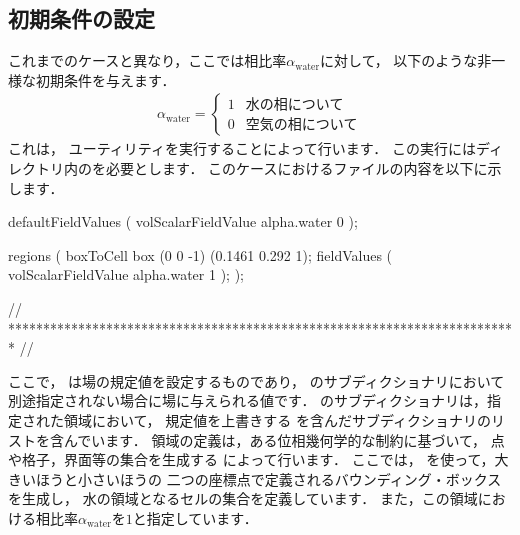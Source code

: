 \subsection{初期条件の設定}
\label{ssec:2.3.3}
これまでのケースと異なり，ここでは相比率$\alpha_{\mathrm{water}}$に対して，
以下のような非一様な初期条件を与えます．
\begin{align}
 \label{eq:2.15}
 \alpha_{\mathrm{water}} =
 \begin{cases}
  1 & \text{水の相について} \\
  0 & \text{空気の相について}
 \end{cases}
\end{align}
これは，
%
%
ユーティリティを実行することによって行います．
この実行にはディレクトリ内のを必要とします．
このケースにおけるファイルの内容を以下に示します．
\begin{OFverbatim}[file, linenum=17]

defaultFieldValues
(
    volScalarFieldValue alpha.water 0
);

regions
(
    boxToCell
    {
        box (0 0 -1) (0.1461 0.292 1);
        fieldValues
        (
            volScalarFieldValue alpha.water 1
        );
    }
);


// ************************************************************************* //
\end{OFverbatim}
ここで，
%
%
は場の規定値を設定するものであり，
%
%
のサブディクショナリにおいて別途指定されない場合に場に与えられる値です．
のサブディクショナリは，指定された領域において，
規定値を上書きする
%
%
を含んだサブディクショナリのリストを含んでいます．
領域の定義は，ある位相幾何学的な制約に基づいて，
点や格子，界面等の集合を生成する
%
%
によって行います．
ここでは，
%
%
を使って，大きいほうと小さいほうの
二つの座標点で定義されるバウンディング・ボックスを生成し，
水の領域となるセルの集合を定義しています．
また，この領域における相比率$\alpha_{\mathrm{water}}$を$1$と指定しています．


